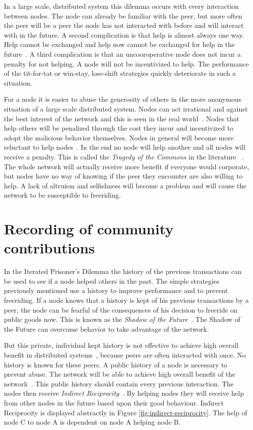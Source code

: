 In a large scale, distributed system this dilemma occurs with every interaction between nodes.
The node can already be familiar with the peer,
but more often the peer will be a peer the node has not interacted with before
and will interact with in the future.
A second complication is that help is almost always one way.
Help cannot be exchanged and help now cannot be exchanged for help in the future~\cite{Lai-Incentives}.
A third complication is that an uncooroperative node does not incur a penalty for not helping.
A node will not be incentivized to help.
The performance of the tit-for-tat or win-stay, lose-shift strategies
quickly deteriorate in such a situation.

For a node it is easier to abuse the generosity of others in the more anonymous situation of a large scale distributed system.
Nodes can act irrational and against the best interest of the network
and this is seen in the real world~\cite{Adar-Freeriding}.
Nodes that help others will be penalized through the cost they incur
and incentivized to adopt the malicious behavior themselves.
Nodes in general will become more reluctant to help nodes~\cite{Nowak-PrisonerDilemma}.
In the end no node will help another and all nodes will receive a penalty.
This is called the \emph{Tragedy of the Commons} in the literature ~\cite{Hardin-Tragedy}.
The whole network will actually receive more benefit if everyone would corporate,
but nodes have no way of knowing if the peer they encounter are also willing to help.
A lack of altruism and selfishness will become a problem 
and will cause the network to be susceptible to freeriding.

\section{Recording of community contributions}
In the Iterated Prisoner's Dilemma the history of the previous transactions can be used 
to see if a node helped others in the past.
The simple strategies previously mentioned use a history to improve performance
and to prevent freeriding.
If a node knows that a history is kept of his previous transactions by a peer,
the node can be fearful of the consequences of his decision to freeride on public goods now.
This is known as the \emph{Shadow of the Future}~\cite{bo-shadow}.
The Shadow of the Future can overcome behavior to take advantage of the network.

But this private, individual kept history is not effective
to achieve high overall benefit in distributed systems~\cite{Lai-Incentives},
because peers are often interacted with once.
No history is known for these peers.
A public history of a node is necessary to prevent abuse.
The network will be able to achieve high overall benefit of the network~\cite{Lai-Incentives}.
This public history should contain every previous interaction.
The nodes then receive \emph{Indirect Reciprocity}~\cite{Nowak-Cooperation}.
By helping nodes they will receive help from other nodes in the future based upon their good behaviour.
Indirect Reciprocity is displayed abstractly in Figure \ref{fig:indirect-reciprocity}.
The help of node C to node A is dependent on node A helping node B.


